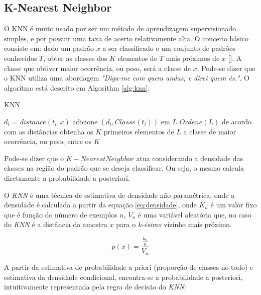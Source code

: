 \subsection{K-Nearest Neighbor}
\label{subsec:knn}

O KNN é muito usado por ser um método de aprendizagem supervisionado simples, e por possuir uma taxa de acerto relativamente alta. O conceito básico consiste em: dado um padrão $x$ a ser classificado e um conjunto de padrões conhecidos $T$, obter as classes dos $K$ elementos de $T$ mais próximos de $x$ [\cite{dvro:tg}]. A classe que obtiver maior ocorrência, ou peso, será a classe de $x$. Pode-se dizer que o KNN utiliza uma abordagem \textit{"Diga-me com quem andas, e direi quem és."}. O algoritmo está descrito em Algorithm \ref{alg:knn}.

\begin{algorithm}[H]
\caption{KNN}
\label{alg:knn}
\begin{algorithmic}[1]
\STATE  $d_i$ = $distance(t_i, x)$
\STATE  adicione $(d_i, Classe(t_i))$ em $L$
\ENDFOR
\STATE $Ordene(L)$ de acordo com as distâncias
\STATE obtenha os $K$ primeiros elementos de $L$
\RETURN a classe de maior ocorrência, ou peso, entre os $K$
\end{algorithmic}
\end{algorithm}


Pode-se dizer que o $K-Nearest Neighbor$ atua considerando a densidade das classes na região do padrão que se deseja classificar. Ou seja, o mesmo calcula diretamente a probabilidade a posteriori.

O \textit{KNN} é uma técnica de estimativa de densidade não paramétrica, onde a densidade é calculada a partir da equação \ref{eq:densidade}, onde $K_n$ é um valor fixo que é função do número de exemplos $n$, $V_n$ é uma variável aleatória que, no caso do \textit{KNN} é a distância da amostra $x$ para o \textit{k-ésimo} vizinho mais próximo.

\begin{equation}
\label{eq:densidade}
p(x) = \frac{\frac{k_n}{n}}{V_n}
\end{equation}

A partir da estimativa de probabilidade a priori (proporção de classes no todo) e estimativa da densidade condicional, encontra-se a probabilidade a posteriori, intuitivamente representada pela regra de decisão do \textit{KNN}:

